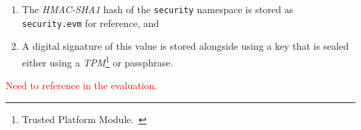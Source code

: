 \begin{enumerate}
    \item The \textit{HMAC-SHA1} hash of the \texttt{security} namespace is stored as \texttt{security.evm} for reference, and
    \item A digital signature of this value is stored alongside using a key that is sealed either using a \textit{TPM}\footnote{Trusted Platform Module.~\cite{tpm}} or passphrase.
\end{enumerate}

\textcolor{red}{Need to reference in the evaluation.}